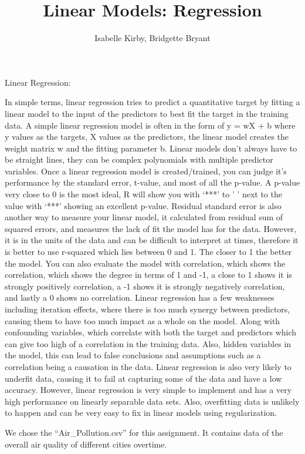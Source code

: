 \documentclass[
]{article}
\title{Linear Models: Regression}
\author{Isabelle Kirby, Bridgette Bryant}
\date{}
\begin{document}
\maketitle

Linear Regression:

In simple terms, linear regression tries to predict a quantitative
target by fitting a linear model to the input of the predictors to best
fit the target in the training data. A simple linear regression model is
often in the form of y = wX + b where y values as the targets, X values
as the predictors, the linear model creates the weight matrix w and the
fitting parameter b. Linear models don't always have to be straight
lines, they can be complex polynomials with multiple predictor
variables. Once a linear regression model is created/trained, you can
judge it's performance by the standard error, t-value, and most of all
the p-value. A p-value very close to 0 is the most ideal, R will show
you with `***' to ' ' next to the value with `***' showing an excellent
p-value. Residual standard error is also another way to measure your
linear model, it calculated from residual sum of squared errors, and
measures the lack of fit the model has for the data. However, it is in
the units of the data and can be difficult to interpret at times,
therefore it is better to use r-squared which lies between 0 and 1. The
closer to 1 the better the model. You can also evaluate the model with
correlation, which shows the correlation, which shows the degree in
terms of 1 and -1, a close to 1 shows it is strongly positively
correlation, a -1 shows it is strongly negatively correlation, and
lastly a 0 shows no correlation. Linear regression has a few weaknesses
including iteration effects, where there is too much synergy between
predictors, causing them to have too much impact as a whole on the
model. Along with confounding variables, which correlate with both the
target and predictors which can give too high of a correlation in the
training data. Also, hidden variables in the model, this can lead to
false conclusions and assumptions such as a correlation being a
causation in the data. Linear regression is also very likely to underfit
data, causing it to fail at capturing some of the data and have a low
accuracy. However, linear regression is very simple to implement and has
a very high performance on linearly separable data sets. Also,
overfitting data is unlikely to happen and can be very easy to fix in
linear models using regularization.

We chose the ``Air\_Pollution.csv'' for this assignment. It contains
data of the overall air quality of different cities overtime.
\end{document}
